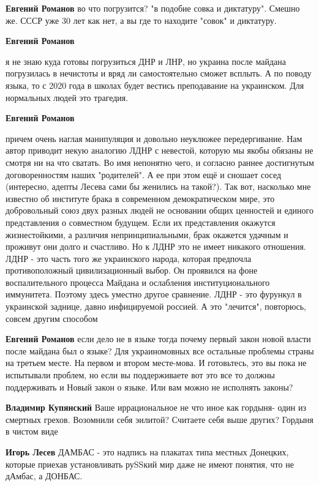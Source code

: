 \begin{itemize}
\begin{itemize}
\textbf{Евгений Романов} во что погрузится? "в подобие совка и диктатуру". Смешно же. СССР уже 30 лет как нет, а вы где то находите "совок" и диктатуру.

\textbf{Евгений Романов} 

я не знаю куда готовы погрузиться ДНР и ЛНР, но украина после майдана
погрузилась в нечистоты и вряд ли самостоятельно сможет всплыть. А по поводу
языка, то с 2020 года в школах будет вестись преподавание на украинском. Для
нормальных людей это трагедия.

\textbf{Евгений Романов} 

причем очень наглая манипуляция и довольно неуклюжее передергивание. Нам автор
приводит некую аналогию ЛДНР с невестой, которую мы якобы обязаны не смотря ни
на что сватать. Во имя непонятно чего, и согласно раннее достигнутым
договоренностям наших "родителей". А ее при этом ещё и сношает сосед
(интересно, адепты Лесева сами бы женились на такой?). Так вот, насколько мне
известно об институте брака в современном демократическом мире, это
добровольный союз двух разных людей не основании общих ценностей и единого
представления о совместном будущем. Если их представления окажутся
жизнестойкими, а различия непринципиальными, брак окажется удачным и проживут
они долго и счастливо. Но к ЛДНР это не имеет никакого отношения. ЛДНР - это
часть того же украинского народа, которая предпочла противоположный
цивилизационный выбор. Он проявился на фоне воспалительного процесса Майдана и
ослабления институционального иммунитета. Поэтому здесь уместно другое
сравнение. ЛДНР - это фурункул в украинской заднице, давно инфицируемой
россией. А это "лечится", повторюсь, совсем другим способом

\textbf{Евгений Романов} если дело не в языке тогда почему первый закон новой власти после майдана был о языке? Для украиномовных все остальные проблемы страны на третьем месте. На первом и втором месте-мова. И готовьтесь, это вы пока не испытывали проблем, но если вы поддерживаете вот это все то должны поддерживать и Новый закон о языке. Или вам можно не исполнять законы?

\textbf{Владимир Купянский} Ваше иррациональное не что иное как гордыня- один из смертных грехов. Возомнили себя эилитой? Считаете себя выше других? Гордыня в чистом виде

\textbf{Игорь Лесев} ДАМБАС - это надпись на плакатах типа местных Донецких, которые приехав установливать руSSкий мир даже не имеют понятия, что не дАмбас, а ДОНБАС.


\end{itemize}
\end{itemize}
